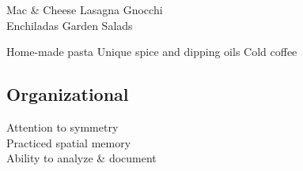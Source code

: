 \documentclass[]{resume-openfont}
\begin{document}
\begin{minipage}[t]{0.33\textwidth}
\textbullet{} Mac \& Cheese \textbullet{} Lasagna \textbullet{} Gnocchi \\
\textbullet{} Enchiladas \textbullet{} Garden Salads

\textbullet{} Home-made pasta \textbullet{} Unique spice and dipping oils \textbullet{} Cold coffee
\sectionsep

\subsection{Organizational}
\textbullet{} Attention to symmetry            \\
\textbullet{} Practiced spatial memory         \\
\textbullet{} Ability to analyze \& document  \\
\sectionsep


%
%

\end{minipage} 
\hfill
\end{document}
